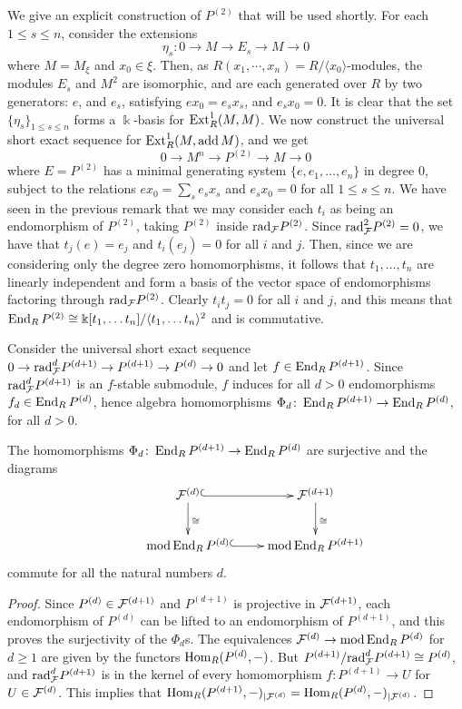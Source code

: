 \documentclass[10pt]{amsart}
\begin{document}
\begin{Example}\label{P^2}  We give an explicit construction of $P^{(2)}$ that will be used shortly. For each $1\le s\le n$, consider the extensions $$\eta_s\colon 0\to M\to E_s\to M \to 0$$ where $M=M_{\xi}$ and $x_0\in\xi$. Then, as $R(x_1,\cdots,x_n)=R/{\langle x_0\rangle}$-modules, the modules $E_s$ and $M^2$ are isomorphic, and are each generated over $R$ by two generators: $e$, and $e_s$, satisfying $ex_0 = e_sx_s$, and   $e_sx_0 =0$. It is clear that the set $\{\eta_s\}_{1\le s\le n}$ forms a $\Bbbk$-basis for $\operatorname{Ext}\nolimits^1_R(M,M)$. We now construct the universal
short exact sequence for $\operatorname{Ext}\nolimits_R^1(M,\operatorname{add} M )$, and we get  $$0\to M^n \to P^{(2)}\to M \to 0$$ where $E=P^{(2)}$
has a minimal generating system $\{e,e_1,\ldots ,e_n\}$ in degree 0, subject to the relations
$ex_0 = \sum_s e_sx_s$ and $e_sx_0 =0$ for all $1\leq s\leq n$.
We have seen in the previous remark that we may consider each $t_i$ as being an endomorphism of $P^{(2)}$, taking $P^{(2)}$ inside $\mbox{rad}_{\mathcal F}P^{(2)}$. Since  $\mbox{rad}^2_{\mathcal F}P^{(2)}=0$, we have that $t_j(e) = e_j$ and $t_i(e_j) =0$ for all $i$ and $j$. Then, since we are considering only the degree zero homomorphisms, it follows that $t_1,\ldots ,t_n$ are linearly independent
and form a basis of the vector space of endomorphisms factoring through $\mbox{rad}_{\mathcal F}P^{(2)}$. Clearly $t_it_j =0$ for all $i$ and $j$, and 
this means that $\operatorname{End}_RP^{(2)}\cong \Bbbk [t_1,\ldots t_n]/\langle t_1,\ldots t_n\rangle ^2$ and  is commutative.
\end{Example}



 \noindent  Consider the universal short exact sequence $0\to\mbox{rad}_{\mathcal F}^{d}P^{(d+1)}\to P^{(d+1)}\to P^{(d)}\to 0$
 and let $f\in\operatorname{End}_RP^{(d+1)}$.  Since $\mbox{rad}_{\mathcal F}^{d}P^{(d+1)} $ is an $f$-stable submodule, $f$ induces for all $d>0$ 
 endomorphisms $f_d\in \operatorname{End}_RP^{(d)}$, hence algebra homomorphisms  $\Phi_d\colon\operatorname{End}_RP^{(d+1)}\to\operatorname{End}_RP^{(d)}$, for all
 $d>0$.
 
\begin{lemma}\label{square} The homomorphisms  $\Phi_d\colon\operatorname{End}_RP^{(d+1)}\to\operatorname{End}_RP^{(d)}$ are surjective and
the diagrams
$$ 
\xymatrix
{ &\mathcal F^{(d)}\ar^{\cong}[d]\ar@{^{(}->}[r]
&\mathcal F^{(d+1)}\ar^{\cong}[d]
\\ &\md\End_RP^{(d)}\ar@{^{(}->}[r]
&\md\End_RP^{(d+1)}}
$$
commute for all the natural numbers $d$.
\end{lemma}
\begin{proof}  Since $P^{(d)}\in \mathcal F^{(d+1)}$ and $P^{(d+1)}$ is projective in $ \mathcal F^{(d+1)}$, each endomorphism of
$P^{(d)}$ can be lifted to an endomorphism  of $P^{(d+1)}$, and this proves the surjectivity of the $\Phi_d$s.
The equivalences $\mathcal F^{(d)}\to\operatorname{mod}\operatorname{End}_RP^{(d)}$ for $d\geq 1$ are given by the functors
$\operatorname{Hom}_R(P^{(d)},-)$. But $P^{(d+1)}/\mbox{rad}^d_{\mathcal F}P^{(d+1)}\cong P^{(d)}$, and
$\mbox{rad}^d_{\mathcal F}P^{(d+1)}$ is in the kernel of every homomorphism $f\colon P^{(d+1)}\to U$ for $U\in \mathcal F^{(d)}$. This implies that
 $\operatorname{Hom}_R(P^{(d+1)},-)_{|\mathcal F^{(d)}}=\operatorname{Hom}_R(P^{(d)},-)_{|\mathcal F^{(d)}}$.
\end{proof}
\end{document}
